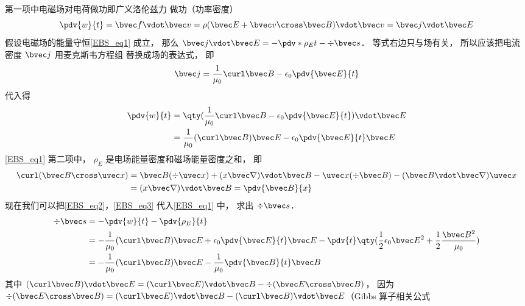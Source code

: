 第一项中电磁场对电荷做功即广义洛伦兹力%
做功（功率密度）
\begin{equation}
\pdv{w}{t} = \bvec f \vdot \bvec v = \rho (\bvec E + \bvec v \cross \bvec B) \vdot \bvec v = \bvec j \vdot \bvec E
\end{equation} 
假设电磁场的能量守恒\autoref{EBS_eq1} 成立， 那么 $\bvec j \vdot \bvec E =  - \pdv*{\rho_E}{t} - \div \bvec s$． 等式右边只与场有关， 所以应该把电流密度 $\bvec j$ 用麦克斯韦方程组%
替换成场的表达式， 即
\begin{equation}
\bvec j = \frac{1}{\mu_0} \curl \bvec B - \epsilon_0 \pdv{\bvec E}{t}
\end{equation} 
代入得
\begin{equation}\label{EBS_eq2}
\begin{aligned}
\pdv{w}{t} &= \qty(\frac{1}{\mu_0} \curl \bvec B - \epsilon_0 \pdv{\bvec E}{t}) \vdot \bvec E\\
&= \frac{1}{\mu_0} (\curl \bvec B)\bvec E - \epsilon_0 \pdv{\bvec E}{t} \bvec E
\end{aligned}
\end{equation} 
\autoref{EBS_eq1} 第二项中， $\rho_E$ 是电场能量密度和磁场能量密度之和， 即
\begin{equation}\label{EBS_eq3}
\begin{aligned}
\curl (\bvec B \cross \uvec x) &= \bvec B(\div \uvec x) + (x\bvec\nabla) \vdot\bvec B - \uvec x( \div \bvec B) - (\bvec B\vdot\bvec\nabla)\uvec x \\
&= (x\bvec\nabla)\vdot\bvec B = \pdv{\bvec B}{x}
\end{aligned}\end{equation} 
现在我们可以把\autoref{EBS_eq2}，\autoref{EBS_eq3} 代入\autoref{EBS_eq1} 中， 求出 $\div \bvec s$． 
\begin{equation}
\begin{aligned}
\div \bvec s &=  - \pdv{w}{t} - \pdv{\rho_E}{t}\\
&= -\frac{1}{\mu_0} (\curl \bvec B)\bvec E + \epsilon_0 \pdv{\bvec E}{t} \bvec E - \pdv{t} \qty( \frac12 \epsilon_0 \bvec E^2 + \frac12 \frac{\bvec B^2}{\mu_0} )\\
&=  - \frac{1}{\mu_0} (\curl \bvec B)\bvec E - \frac{1}{\mu_0} \pdv{\bvec B}{t}\bvec B
\end{aligned}
\end{equation} 
其中 $(\curl \bvec B) \vdot \bvec E = (\curl \bvec E) \vdot \bvec B - \div (\bvec E \cross \bvec B)$， 因为 $\div (\bvec E \cross \bvec B) = (\curl \bvec E) \vdot \bvec B - (\curl \bvec B) \vdot \bvec E$（Gibbs 算子相关公式%
